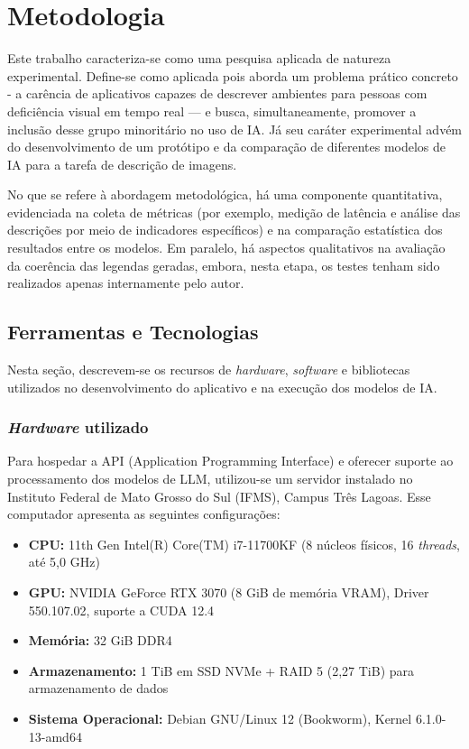 \chapter{Metodologia}  \label{cap:03}

Este trabalho caracteriza-se como uma pesquisa aplicada de natureza experimental. Define-se como aplicada pois aborda um problema prático concreto - a carência de aplicativos capazes de descrever ambientes para pessoas com deficiência visual em tempo real — e busca, simultaneamente, promover a inclusão desse grupo minoritário no uso de IA. Já seu caráter experimental advém do desenvolvimento de um protótipo e da comparação de diferentes modelos de IA para a tarefa de descrição de imagens.

No que se refere à abordagem metodológica, há uma componente quantitativa, evidenciada na coleta de métricas (por exemplo, medição de latência e análise das descrições por meio de indicadores específicos) e na comparação estatística dos resultados entre os modelos. Em paralelo, há aspectos qualitativos na avaliação da coerência das legendas geradas, embora, nesta etapa, os testes tenham sido realizados apenas internamente pelo autor.

\section{Ferramentas e Tecnologias}

Nesta seção, descrevem-se os recursos de \textit{hardware}, \textit{software} e bibliotecas utilizados no desenvolvimento do aplicativo e na execução dos modelos de IA.

\subsection{\textit{Hardware} utilizado}

Para hospedar a API (Application Programming Interface) e oferecer suporte ao processamento dos modelos de LLM, utilizou-se um servidor instalado no Instituto Federal de Mato Grosso do Sul (IFMS), Campus Três Lagoas. Esse computador apresenta as seguintes configurações:

\begin{itemize}
    \item \textbf{CPU:} 11th Gen Intel(R) Core(TM) i7-11700KF (8 núcleos físicos, 16 \textit{threads}, até 5,0 GHz)
    \item \textbf{GPU:} NVIDIA GeForce RTX 3070 (8 GiB de memória VRAM), Driver 550.107.02, suporte a CUDA 12.4
    \item \textbf{Memória:} 32 GiB DDR4
    \item \textbf{Armazenamento:} 1 TiB em SSD NVMe + RAID 5 (2,27 TiB) para armazenamento de dados
    \item \textbf{Sistema Operacional:} Debian GNU/Linux 12 (Bookworm), Kernel 6.1.0-13-amd64
\end{itemize}

